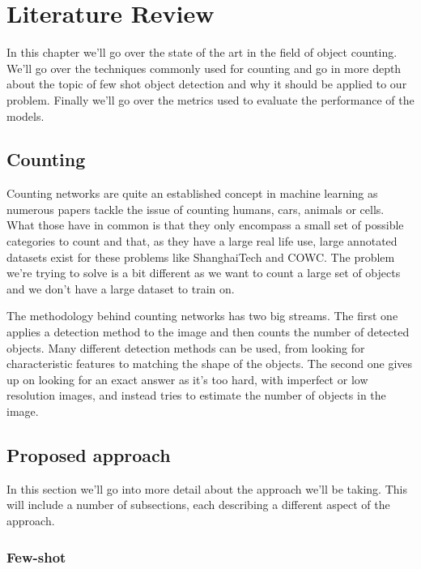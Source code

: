 
\chapter{Literature Review}
    In this chapter we'll go over the state of the art in the field of object counting. We'll go over the techniques commonly used for counting and go in more depth about the topic of few shot object detection and why it should be applied to our problem. Finally we'll go over the metrics used to evaluate the performance of the models.

\section{Counting}
    Counting networks are quite an established concept in machine learning as numerous papers tackle the issue of counting humans, cars, animals or cells. What those have in common is that they only encompass a small set of possible categories to count and that, as they have a large real life use, large annotated datasets exist for these problems like ShanghaiTech and COWC. The problem we're trying to solve is a bit different as we want to count a large set of objects and we don't have a large dataset to train on. 
    
    The methodology behind counting networks has two big streams. The first one applies a detection method to the image and then counts the number of detected objects. Many different detection methods can be used, from looking for characteristic features to matching the shape of the objects. The second one gives up on looking for an exact answer as it's too hard, with imperfect or low resolution images, and instead tries to estimate the number of objects in the image.



    
    
\section{Proposed approach}
    In this section we'll go into more detail about the approach we'll be taking.
    This will include a number of subsections, each describing a different aspect of the approach.
    \subsection{Few-shot}


